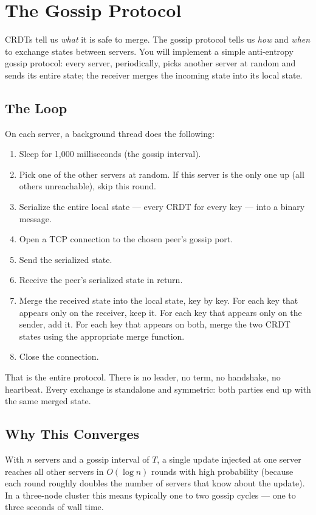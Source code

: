 \documentclass[11pt,a4paper]{article}
\begin{document}
\section{The Gossip Protocol}

CRDTs tell us \textit{what} it is safe to merge. The gossip protocol tells us \textit{how} and \textit{when} to exchange states between servers. You will implement a simple anti-entropy gossip protocol: every server, periodically, picks another server at random and sends its entire state; the receiver merges the incoming state into its local state.

\subsection{The Loop}
On each server, a background thread does the following:

\begin{enumerate}
\item Sleep for 1{,}000 milliseconds (the gossip interval).
\item Pick one of the other servers at random. If this server is the only one up (all others unreachable), skip this round.
\item Serialize the entire local state --- every CRDT for every key --- into a binary message.
\item Open a TCP connection to the chosen peer's gossip port.
\item Send the serialized state.
\item Receive the peer's serialized state in return.
\item Merge the received state into the local state, key by key. For each key that appears only on the receiver, keep it. For each key that appears only on the sender, add it. For each key that appears on both, merge the two CRDT states using the appropriate merge function.
\item Close the connection.
\end{enumerate}

That is the entire protocol. There is no leader, no term, no handshake, no heartbeat. Every exchange is standalone and symmetric: both parties end up with the same merged state.

\subsection{Why This Converges}
With $n$ servers and a gossip interval of $T$, a single update injected at one server reaches all other servers in $O(\log n)$ rounds with high probability (because each round roughly doubles the number of servers that know about the update). In a three-node cluster this means typically one to two gossip cycles --- one to three seconds of wall time.
\end{document}
